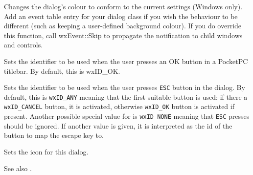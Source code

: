 

Changes the dialog's colour to conform to the current settings (Windows only).
Add an event table entry for your dialog class if you wish the behaviour
to be different (such as keeping a user-defined
background colour). If you do override this function, call wxEvent::Skip to
propagate the notification to child windows and controls.




\label{wxdialogsetaffirmativeid}


Sets the identifier to be used when the user presses an OK button in a PocketPC titlebar.
By default, this is wxID\_OK.




\label{wxdialogsetescapeid}


Sets the identifier to be used when the user presses \texttt{\textsc{ESC}}
button in the dialog. By default, this is \texttt{wxID\_ANY} meaning that
the first suitable button is used: if there a \texttt{wxID\_CANCEL} button, it
is activated, otherwise \texttt{wxID\_OK} button is activated if present.
Another possible special value for  is \texttt{wxID\_NONE} meaning that
\texttt{\textsc{ESC}} presses should be ignored. If another value is given, it
is interpreted as the id of the button to map the escape key to.


\label{wxdialogseticon}


Sets the icon for this dialog.



See also .


\label{wxdialogseticons}


